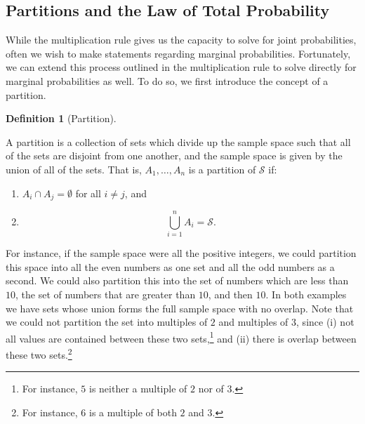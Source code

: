 \documentclass[
  letterpaper,
  DIV=11,
  numbers=noendperiod]{scrreprt}
\providecommand{\tightlist}{%
  \setlength{\itemsep}{0pt}\setlength{\parskip}{0pt}}\usepackage{longtable,booktabs,array}
\theoremstyle{definition}
\newtheorem{definition}{Definition}[chapter]
\theoremstyle{definition}
\theoremstyle{definition}
\theoremstyle{remark}
\begin{document}
\subsection{Partitions and the Law of Total
Probability}\label{partitions-and-the-law-of-total-probability}

While the multiplication rule gives us the capacity to solve for joint
probabilities, often we wish to make statements regarding marginal
probabilities. Fortunately, we can extend this process outlined in the
multiplication rule to solve directly for marginal probabilities as
well. To do so, we first introduce the concept of a partition.

\begin{definition}[Partition]\protect\hypertarget{def-partition}{}\label{def-partition}

A partition is a collection of sets which divide up the sample space
such that all of the sets are disjoint from one another, and the sample
space is given by the union of all of the sets. That is,
\(A_1,\dots,A_n\) is a partition of \(\mathcal{S}\) if:

\begin{enumerate}
\def\labelenumi{\arabic{enumi}.}
\tightlist
\item
  \(A_i \cap A_j = \emptyset\) for all \(i \neq j\), and
\item
  \[\bigcup_{i=1}^n A_i = \mathcal{S}.\]
\end{enumerate}

\end{definition}

For instance, if the sample space were all the positive integers, we
could partition this space into all the even numbers as one set and all
the odd numbers as a second. We could also partition this into the set
of numbers which are less than \(10\), the set of numbers that are
greater than \(10\), and then \(10\). In both examples we have sets
whose union forms the full sample space with no overlap. Note that we
could not partition the set into multiples of \(2\) and multiples of
\(3\), since (i) not all values are contained between these two
sets,\footnote{For instance, \(5\) is neither a multiple of \(2\) nor of
  \(3\).} and (ii) there is overlap between these two sets.\footnote{For
  instance, \(6\) is a multiple of both \(2\) and \(3\).}
\end{document}
